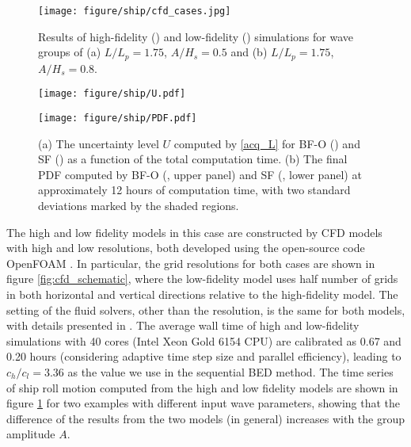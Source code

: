 \documentclass[11pt]{article}
\begin{document}
\begin{figure}
    \centering
    \texttt{[image: figure/ship/cfd\_cases.jpg]}
    \caption{%
    Results of high-fidelity (\blackline) and low-fidelity (\blueline) simulations for wave groups of (a) $L/L_p=1.75$, $A/H_s=0.5$ and (b) $L/L_p=1.75$, $A/H_s=0.8$.}
    \label{fig:cfd_results}
\end{figure}

\begin{figure}
\centering
\quad
\begin{minipage}[b]{0.443\linewidth}
\texttt{[image: figure/ship/U.pdf]}
\end{minipage}
\begin{minipage}[b]{0.46\linewidth}
\texttt{[image: figure/ship/PDF.pdf]}
\end{minipage}
\caption{(a) The uncertainty level $U$ computed by \eqref{acq_L} for BF-O (\blueline) and SF (\orangeline) as a function of the total computation time. (b) The final PDF computed by BF-O (\blueline, upper panel) and SF (\orangeline, lower panel) at approximately 12 hours of computation time, with two standard deviations marked by the shaded regions.}
\label{fig:ship_results}
\end{figure}

The high and low fidelity models in this case are constructed by CFD models with high and low resolutions, both developed using the open-source code OpenFOAM \cite{jasak2009openfoam}. In particular, the grid resolutions for both cases are shown in figure \ref{fig:cfd_schematic}, where the low-fidelity model uses half number of grids in both horizontal and vertical directions relative to the high-fidelity model. The setting of the fluid solvers, other than the resolution, is the same for both models, with details presented in \cite{gong2021full}. The average wall time of high and low-fidelity simulations with 40 cores (Intel Xeon Gold 6154 CPU) are calibrated as 0.67 and 0.20 hours (considering adaptive time step size and parallel efficiency), leading to $c_h/c_l=3.36$ as the value we use in the sequential BED method. The time series of ship roll motion computed from the high and low fidelity models are shown in figure \ref{fig:cfd_results} for two examples with different input wave parameters, showing that the difference of the results from the two models (in general) increases with the group amplitude $A$. 
\end{document}
